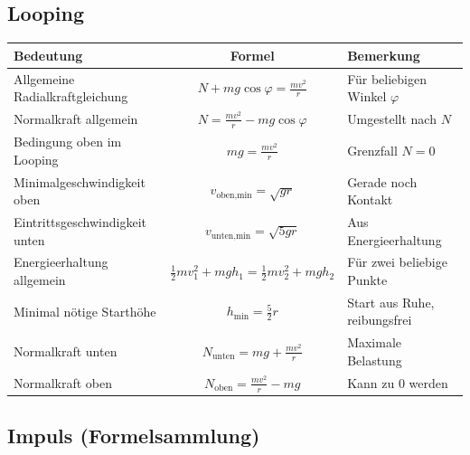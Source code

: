 \documentclass[10pt,a4paper]{article}
\begin{document}
		\subsection{Looping}
		\begin{table}[H]
			\centering
			\begin{tabular}{|l|c|l|}
				\hline
				\textbf{Bedeutung} & \textbf{Formel} & \textbf{Bemerkung} \\ \hline
				
				Allgemeine Radialkraftgleichung &
				$\displaystyle N + mg\cos\varphi = \frac{mv^2}{r}$ &
				Für beliebigen Winkel $\varphi$ \\ \hline
				
				Normalkraft allgemein &
				$\displaystyle N = \frac{mv^2}{r} - mg\cos\varphi$ &
				Umgestellt nach $N$ \\ \hline
				
				Bedingung oben im Looping &
				$\displaystyle mg = \frac{mv^2}{r}$ &
				Grenzfall $N=0$ \\ \hline
				
				Minimalgeschwindigkeit oben &
				$\displaystyle v_{\text{oben,min}} = \sqrt{gr}$ &
				Gerade noch Kontakt \\ \hline
				
				Eintrittsgeschwindigkeit unten &
				$\displaystyle v_{\text{unten,min}} = \sqrt{5gr}$ &
				Aus Energieerhaltung \\ \hline
				
				Energieerhaltung allgemein &
				$\displaystyle \frac12 mv_1^2 + mgh_1 =
				\frac12 mv_2^2 + mgh_2$ &
				Für zwei beliebige Punkte \\ \hline
				
				Minimal nötige Starthöhe &
				$\displaystyle h_{\min} = \frac{5}{2} r$ &
				Start aus Ruhe, reibungsfrei \\ \hline
				
				Normalkraft unten &
				$\displaystyle N_{\text{unten}} = mg + \frac{mv^2}{r}$ &
				Maximale Belastung \\ \hline
				
				Normalkraft oben &
				$\displaystyle N_{\text{oben}} = \frac{mv^2}{r} - mg$ &
				Kann zu $0$ werden \\ \hline
			\end{tabular}
		\end{table}
    \subsection{Impuls (Formelsammlung)}
    
\end{document}

